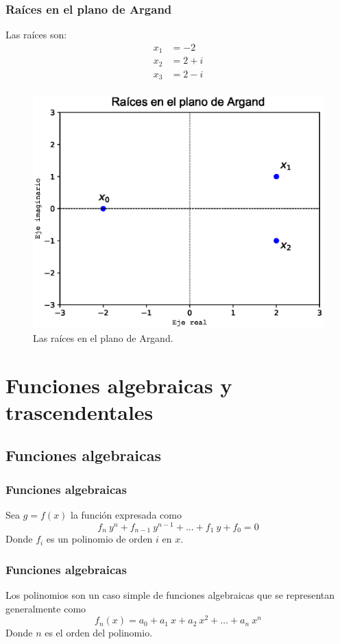 \begin{frame}[fragile]
\captionsetup{justification=centering}
\frametitle{Raíces en el plano de Argand}
\fontsize{12}{12}\selectfont
\begin{minipage}{5cm}
Las raíces son:
\begin{align*}
x_{1} &= -2 \\
x_{2} &= 2 + i \\
x_{3} &= 2 - i \\
\end{align*}
\end{minipage}
\hspace{0.5cm}
\begin{minipage}{5cm}
\begin{figure}
    \centering
    \includegraphics[scale=0.4]{Imagenes/raices_polinomio_2020_05.eps} 
    \caption{Las raíces en el plano de Argand.}
\end{figure}
\end{minipage}
\end{frame}    
\section{Funciones algebraicas y trascendentales}
\subsection{Funciones algebraicas}
\begin{frame}
\frametitle{Funciones algebraicas}
Sea $g = f(x)$ la función expresada como
\[ f_{n} \: y^{n} + f_{n-1} \: y^{n - 1} + \ldots + f_{1} \: y + f_{0} = 0 \]
Donde $f_{i}$ es un polinomio de orden $i$ en $x$.
\end{frame}
\begin{frame}
\frametitle{Funciones algebraicas}
Los polinomios son un caso simple de funciones algebraicas que se representan generalmente como
\[f_{n}(x) = a_{0} + a_{1} \: x + a_{2} \: x^{2}+ \ldots + a_{n} \: x^{n} \]
Donde $n$ es el orden del polinomio.
\end{frame}
